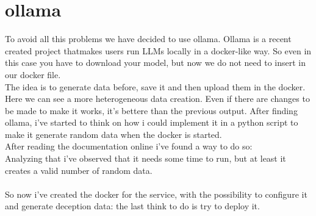 \section{ollama}
To avoid all this problems we have decided to use ollama. Ollama is a recent created project thatmakes users run LLMs locally in a docker-like way. So even in this case you have to download your model, but now we do not need to insert in our docker file.
\\
The idea is to generate data before, save it and then upload them in the docker.
Here we can see a more heterogeneous data creation. Even if there are changes to be made to make it works, it's bettere than the previous output.
After finding ollama, i've started to think on how i could implement it in a python script to make it generate random data when the docker is started.
\\
After reading the documentation online i've found a way to do so:
\\
Analyzing that i've observed that it needs some time to run, but at least it creates a valid number of random data.
\\\\
So now i've created the docker for the service, with the possibility to configure it and generate deception data: the last think to do is try to deploy it.
